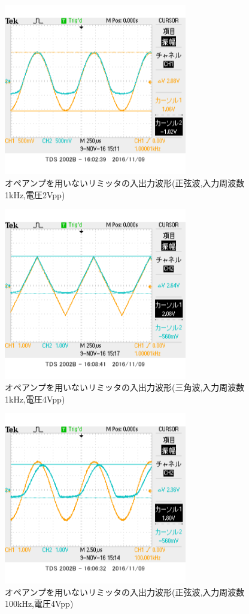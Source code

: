 \documentclass[11pt,a4j]{jsarticle}
\begin{document}
    
    \begin{figure}[htbp]
  \centering
  \includegraphics[width=8cm,clip]{1_1_noampFG_f1V2_ViVo.png}
  \caption{オペアンプを用いないリミッタの入出力波形(正弦波,入力周波数1kHz,電圧2Vpp)}
  \label{fig:noamp_f1V2}
 \end{figure}%
 
 \begin{figure}[htbp]
  \centering
  \includegraphics[width=8cm,clip]{1_1_noampFG_f1V4sankaku_ViVo.png}
  \caption{オペアンプを用いないリミッタの入出力波形(三角波,入力周波数1kHz,電圧4Vpp)}
  \label{fig:noamp_sankaku}
 \end{figure}%
 
 \begin{figure}[htbp]
  \centering
  \includegraphics[width=8cm,clip]{1_1_noampFG_f100V4_ViVo.png}
  \caption{オペアンプを用いないリミッタの入出力波形(正弦波,入力周波数100kHz,電圧4Vpp)}
  \label{fig:noamp_f100V4}
 \end{figure}%
    
\end{document}
